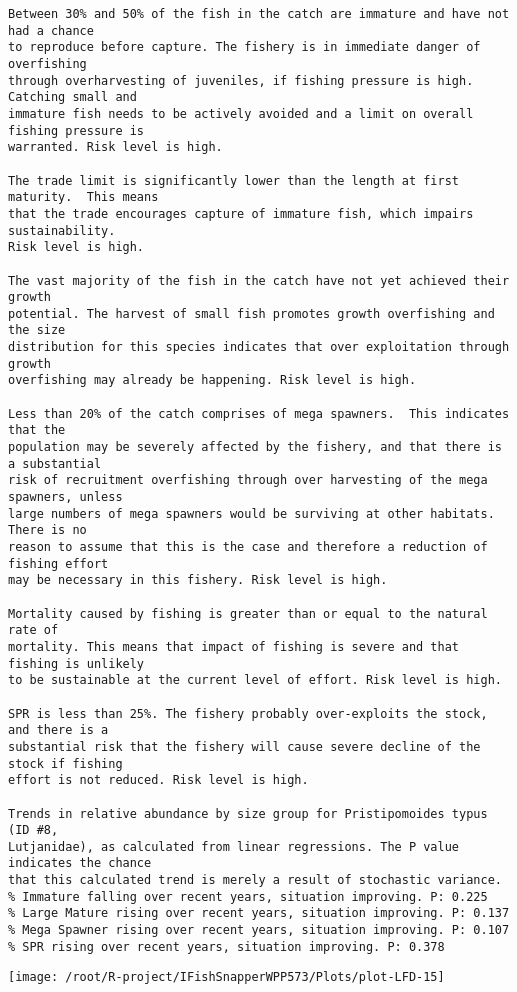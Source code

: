 \documentclass{report}\usepackage[]{graphicx}\usepackage[]{color}
\makeatletter
\def\maxwidth{ %
  \ifdim\Gin@nat@width>\linewidth
    \linewidth
  \else
    \Gin@nat@width
  \fi
}
\newenvironment{kframe}{%
 \def\at@end@of@kframe{}%
 \ifinner\ifhmode%
  \def\at@end@of@kframe{\end{minipage}}%
  \begin{minipage}{\columnwidth}%
 \fi\fi%
 \def\FrameCommand##1{\hskip\@totalleftmargin \hskip-\fboxsep
 \colorbox{shadecolor}{##1}\hskip-\fboxsep
     \hskip-\linewidth \hskip-\@totalleftmargin \hskip\columnwidth}%
 \MakeFramed {\advance\hsize-\width
   \@totalleftmargin\z@ \linewidth\hsize
   \@setminipage}}%
 {\par\unskip\endMakeFramed%
 \at@end@of@kframe}
\newenvironment{knitrout}{}{} %
\makeatother
\begin{document}
\begin{knitrout}
\begin{kframe}
\begin{verbatim}
Between 30% and 50% of the fish in the catch are immature and have not had a chance
to reproduce before capture. The fishery is in immediate danger of overfishing
through overharvesting of juveniles, if fishing pressure is high.  Catching small and
immature fish needs to be actively avoided and a limit on overall fishing pressure is
warranted. Risk level is high.

The trade limit is significantly lower than the length at first maturity.  This means
that the trade encourages capture of immature fish, which impairs sustainability.
Risk level is high.

The vast majority of the fish in the catch have not yet achieved their growth
potential. The harvest of small fish promotes growth overfishing and the size
distribution for this species indicates that over exploitation through growth
overfishing may already be happening. Risk level is high.

Less than 20% of the catch comprises of mega spawners.  This indicates that the
population may be severely affected by the fishery, and that there is a substantial
risk of recruitment overfishing through over harvesting of the mega spawners, unless
large numbers of mega spawners would be surviving at other habitats. There is no
reason to assume that this is the case and therefore a reduction of fishing effort
may be necessary in this fishery. Risk level is high.
 
Mortality caused by fishing is greater than or equal to the natural rate of
mortality. This means that impact of fishing is severe and that fishing is unlikely
to be sustainable at the current level of effort. Risk level is high.
 
SPR is less than 25%. The fishery probably over-exploits the stock, and there is a
substantial risk that the fishery will cause severe decline of the stock if fishing
effort is not reduced. Risk level is high.
 
Trends in relative abundance by size group for Pristipomoides typus (ID #8,
Lutjanidae), as calculated from linear regressions. The P value indicates the chance
that this calculated trend is merely a result of stochastic variance.
% Immature falling over recent years, situation improving. P: 0.225
% Large Mature rising over recent years, situation improving. P: 0.137
% Mega Spawner rising over recent years, situation improving. P: 0.107
% SPR rising over recent years, situation improving. P: 0.378
\end{verbatim}
\end{kframe}
\texttt{[image: /root/R-project/IFishSnapperWPP573/Plots/plot-LFD-15]} 


\end{knitrout}
\end{document}
